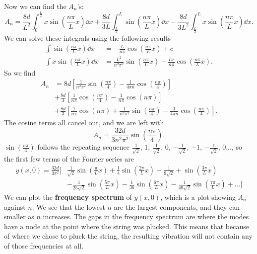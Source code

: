 \documentclass[../classical_mechanics.tex]{subfiles}
\begin{document}
        Now we can find the $A_n$'s:
        \begin{equation}
            A_n=\frac{8d}{L^2}\int_0^{\frac{L}{4}}x\sin\left(\frac{n\pi}{L}x\right)\dd{x}+\frac{8d}{3L}\int_{\frac{L}{4}}^L\sin\left(\frac{n\pi}{L}x\right)\dd{x}-\frac{8d}{3L^2}\int_{\frac{L}{4}}^L x\sin\left(\frac{n\pi}{L}x\right)\dd{x}.
        \end{equation}
        We can solve these integrals using the following results
        \begin{align}
            \int\sin\left(\frac{n\pi}{L}x\right)\dd{x}&=-\frac{L}{n\pi}\cos\left(\frac{n\pi}{L}x\right)+c\\
            \int x\sin\left(\frac{n\pi}{L}x\right)\dd{x}&=\frac{L^2}{n^2\pi^2}\sin\left(\frac{n\pi}{L}x\right)-\frac{Lx}{n\pi}\cos\left(\frac{n\pi}{L}x\right).
        \end{align}
        So we find
        \begin{equation}
            \begin{split}
                A_n&=8d\left[\frac{1}{n^2\pi^2}\sin\left(\frac{n\pi}{4}\right)-\frac{1}{4\pi n}\cos\left(\frac{n\pi}{4}\right)\right]\\
                &+\frac{8d}{3}\left[\frac{1}{n\pi}\cos\left(\frac{n\pi}{4}\right)-\frac{1}{n\pi}\cos(n\pi)\right]\\
                &+\frac{8d}{3}\left[\frac{1}{n\pi}\cos(n\pi)+\frac{1}{n^2\pi^2}\sin\left(\frac{n\pi}{4}\right)-\frac{1}{4\pi n}\cos\left(\frac{n\pi}{4}\right)\right].
            \end{split}
        \end{equation}
        The cosine terms all cancel out, and we are left with
        \begin{equation}
            A_n=\frac{32d}{3n^2\pi^2}\sin\left(\frac{n\pi}{4}\right).
        \end{equation}
        $\sin\left(\frac{n\pi}{4}\right)$ follows the repeating sequence $\frac{1}{\sqrt{2}}$, $1$, $\frac{1}{\sqrt{2}}$, $0$, $-\frac{1}{\sqrt{2}}$, $-1$, $-\frac{1}{\sqrt{2}}$, $0$..., so the first few terms of the Fourier series are
        \begin{equation}
            \begin{split}
                y(x,0)=\frac{32d}{3\pi^2}\biggl[&\frac{1}{\sqrt{2}}\sin\left(\frac{\pi}{L}x\right)+\frac{1}{4}\sin\left(\frac{2\pi}{L}x\right)+\frac{1}{9\sqrt{2}}+\sin\left(\frac{3\pi}{L}x\right)\\
                &-\frac{1}{25\sqrt{2}}\sin\left(\frac{5\pi}{L}x\right)-\frac{1}{36}\sin\left(\frac{6\pi}{L}x\right)-\frac{1}{49\sqrt{2}}\sin\left(\frac{7\pi}{L}x\right)+\dots\biggr]
            \end{split}
        \end{equation}
        We can plot the \textbf{frequency spectrum} of $y(x,0)$, which is a plot showing $A_n$ against $n$.
        We see that the lowest $n$ are the largest components, and they can smaller as $n$ increases.
        The gaps in the frequency spectrum are where the modes have a node at the point where the string was plucked.
        This means that because of where we chose to pluck the string, the resulting vibration will not contain any of those frequencies at all.
\end{document}
